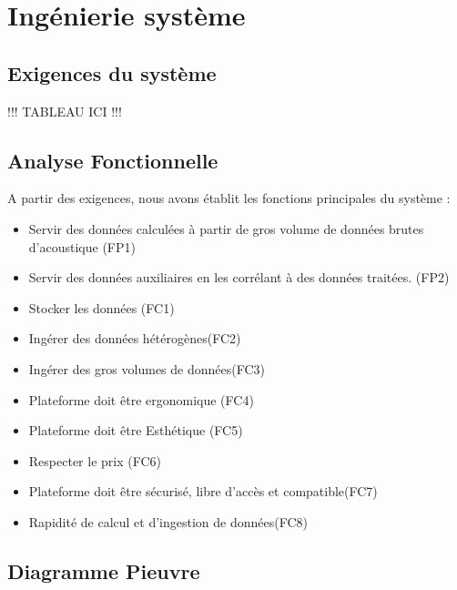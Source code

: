 \documentclass[a4paper]{article}
\begin{document}
\section{Ingénierie système}

\subsection{Exigences du système}

!!! TABLEAU ICI !!!



\subsection{Analyse Fonctionnelle}

A partir des exigences, nous avons établit les fonctions principales du système :

\begin{itemize}

\item Servir des données calculées à partir de gros volume de données brutes
d’acoustique (FP1)

\item Servir des données auxiliaires en les corrélant à des données traitées. (FP2)

\item Stocker les données (FC1)

\item Ingérer des données hétérogènes(FC2)

\item Ingérer des gros volumes de données(FC3)

\item Plateforme doit être ergonomique (FC4)

\item Plateforme doit être Esthétique (FC5)

\item Respecter le prix (FC6)

\item Plateforme doit être sécurisé, libre d’accès et compatible(FC7)

\item Rapidité de calcul et d’ingestion de données(FC8)

\end{itemize}

\newpage
\subsection{Diagramme Pieuvre}
\end{document}
